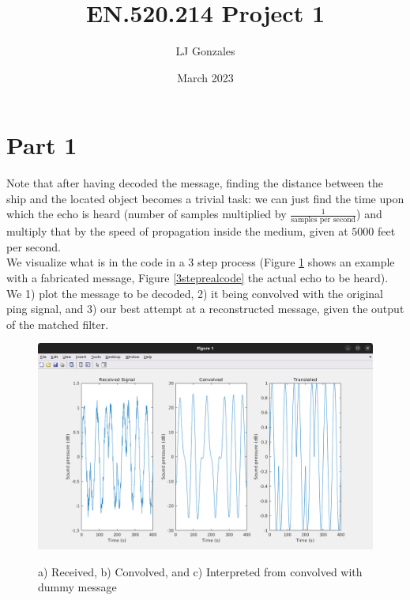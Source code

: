 \documentclass{article}
\title{EN.520.214 Project 1}
\author{LJ Gonzales}
\date{March 2023}
\begin{document}
\maketitle
\section{Part 1}
	Note that after having decoded the message, finding the distance between the ship and the located object becomes a trivial task: we can just find the time upon which the echo is heard (number of samples multiplied by $\frac{1}{\text{samples per second}}$) and multiply that by the speed of propagation inside the medium, given at $5000$ feet per second. \\
	We visualize what is in the code in a 3 step process (Figure \ref{3stepfakecode} shows an example with a fabricated message, Figure \ref{3steprealcode} the actual echo to be heard).
	We 1) plot the message to be decoded, 2) it being convolved with the original ping signal, and 3) our best attempt at a reconstructed message, given the output of the matched filter.
\begin{figure}[h]
	\includegraphics[width =\textwidth]{3stepfakecode.png}
	\label{3stepfakecode}
	\caption{a) Received, b) Convolved, and c) Interpreted from convolved with dummy message}
\end{figure}
\end{document}
